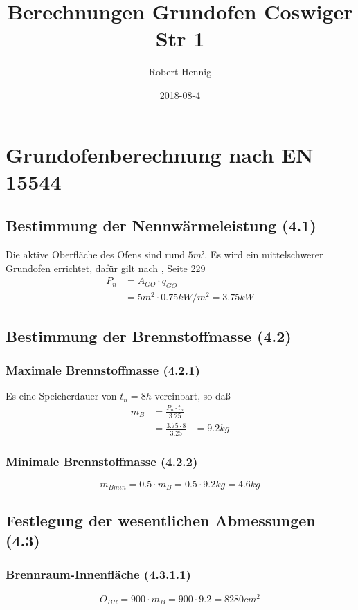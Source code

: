 \documentclass[a4paper,10pt,twoside]{article}
\author{Robert Hennig}
\date{2018-08-4}
\title{Berechnungen Grundofen Coswiger Str 1}
\begin{document}
\maketitle
\setcounter{tocdepth}{2}
\tableofcontents


\section{Grundofenberechnung nach EN 15544 \cite{EN15544}}
\label{sec:org6be199b}
\subsection{Bestimmung der Nennwärmeleistung (4.1)}
\label{sec:org5b09e06}
Die aktive Oberfläche des Ofens sind rund \(5 m²\).
Es wird ein mittelschwerer Grundofen errichtet,
dafür gilt nach \cite{Herrmann2011}, Seite 229 
\begin{align}
P_n & = A_{GO} \cdot q_{GO} \\
    & = 5 m^2 \cdot 0.75 kW/m^2 = 3.75 kW
\end{align}
\subsection{Bestimmung der Brennstoffmasse (4.2)}
\label{sec:org3cead4b}
\subsubsection{Maximale Brennstoffmasse (4.2.1)}
\label{sec:orgacf1b40}
Es eine Speicherdauer von \(t_n=8h\) vereinbart, so daß
\begin{align}
m_B & = \frac{P_n \cdot t_n}{3.25} \\
    & = \frac{3.75 \cdot 8}{3.25} & = 9.2 kg
\end{align}
\subsubsection{Minimale Brennstoffmasse (4.2.2)}
\label{sec:orgfc5f8d8}
\begin{equation}
m_{Bmin} = 0.5 \cdot m_B = 0.5 \cdot 9.2 kg = 4.6 kg
\end{equation}

\subsection{Festlegung der wesentlichen Abmessungen (4.3)}
\label{sec:org86a3b08}
\subsubsection{Brennraum-Innenfläche (4.3.1.1)}
\label{sec:orged00d8b}
\begin{equation}
O_{BR}= 900 \cdot m_{B} = 900 \cdot 9.2 = 8280 cm^2
\end{equation}
\end{document}
